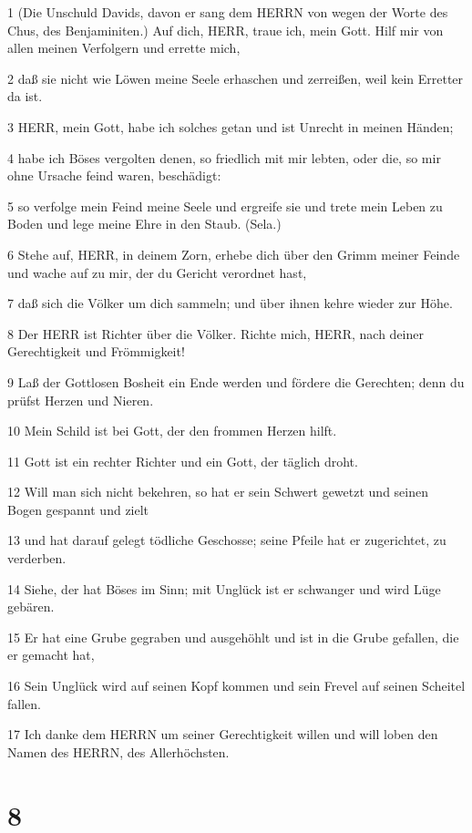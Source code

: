 \par 1 (Die Unschuld Davids, davon er sang dem HERRN von wegen der Worte des Chus, des Benjaminiten.) Auf dich, HERR, traue ich, mein Gott. Hilf mir von allen meinen Verfolgern und errette mich,
\par 2 daß sie nicht wie Löwen meine Seele erhaschen und zerreißen, weil kein Erretter da ist.
\par 3 HERR, mein Gott, habe ich solches getan und ist Unrecht in meinen Händen;
\par 4 habe ich Böses vergolten denen, so friedlich mit mir lebten, oder die, so mir ohne Ursache feind waren, beschädigt:
\par 5 so verfolge mein Feind meine Seele und ergreife sie und trete mein Leben zu Boden und lege meine Ehre in den Staub. (Sela.)
\par 6 Stehe auf, HERR, in deinem Zorn, erhebe dich über den Grimm meiner Feinde und wache auf zu mir, der du Gericht verordnet hast,
\par 7 daß sich die Völker um dich sammeln; und über ihnen kehre wieder zur Höhe.
\par 8 Der HERR ist Richter über die Völker. Richte mich, HERR, nach deiner Gerechtigkeit und Frömmigkeit!
\par 9 Laß der Gottlosen Bosheit ein Ende werden und fördere die Gerechten; denn du prüfst Herzen und Nieren.
\par 10 Mein Schild ist bei Gott, der den frommen Herzen hilft.
\par 11 Gott ist ein rechter Richter und ein Gott, der täglich droht.
\par 12 Will man sich nicht bekehren, so hat er sein Schwert gewetzt und seinen Bogen gespannt und zielt
\par 13 und hat darauf gelegt tödliche Geschosse; seine Pfeile hat er zugerichtet, zu verderben.
\par 14 Siehe, der hat Böses im Sinn; mit Unglück ist er schwanger und wird Lüge gebären.
\par 15 Er hat eine Grube gegraben und ausgehöhlt und ist in die Grube gefallen, die er gemacht hat,
\par 16 Sein Unglück wird auf seinen Kopf kommen und sein Frevel auf seinen Scheitel fallen.
\par 17 Ich danke dem HERRN um seiner Gerechtigkeit willen und will loben den Namen des HERRN, des Allerhöchsten.

\chapter{8}

